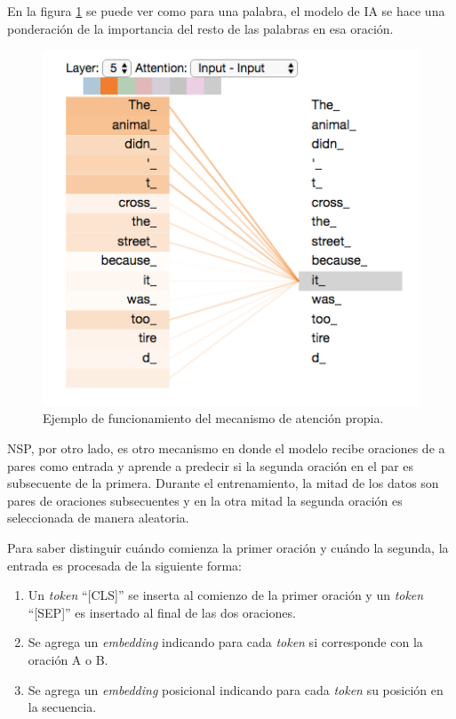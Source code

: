 En la figura \ref{fig:selfattention} se puede ver como para una palabra, el modelo de IA se hace una ponderación de la importancia del resto de las palabras en esa oración.

\begin{figure}[htbp]
	\centering
	\includegraphics[width=.6\textwidth]{./Figures/selfattention.png}
	\caption{Ejemplo de funcionamiento del mecanismo de atención propia\protect\footnotemark.}
	\label{fig:selfattention}
\end{figure}


NSP, por otro lado, es otro mecanismo en donde el modelo recibe oraciones de a pares como entrada y aprende a predecir si la segunda oración en el par es subsecuente de la primera. Durante el entrenamiento, la mitad de los datos son pares de oraciones subsecuentes y en la otra mitad la segunda oración es seleccionada de manera aleatoria.

Para saber distinguir cuándo comienza la primer oración y cuándo la segunda, la entrada es procesada de la siguiente forma:

\begin{enumerate}
	\item Un \textit{token} ``[CLS]'' se inserta al comienzo de la primer oración y un \textit{token} ``[SEP]'' es insertado al final de las dos oraciones.
	\item Se agrega un \textit{embedding} indicando para cada \textit{token} si corresponde con la oración A o B.
	\item Se agrega un \textit{embedding} posicional indicando para cada \textit{token} su posición en la secuencia.
\end{enumerate}

